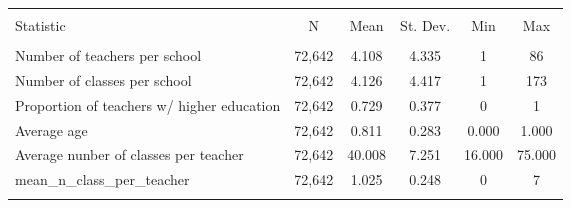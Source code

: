 
\begin{tabular}{@{\extracolsep{5pt}}lccccc} 
\\[-1.8ex]\hline 
\hline \\[-1.8ex] 
Statistic & \multicolumn{1}{c}{N} & \multicolumn{1}{c}{Mean} & \multicolumn{1}{c}{St. Dev.} & \multicolumn{1}{c}{Min} & \multicolumn{1}{c}{Max} \\ 
\hline \\[-1.8ex] 
Number of teachers per school & 72,642 & 4.108 & 4.335 & 1 & 86 \\ 
Number of classes per school & 72,642 & 4.126 & 4.417 & 1 & 173 \\ 
Proportion of teachers w/ higher education & 72,642 & 0.729 & 0.377 & 0 & 1 \\ 
Average age & 72,642 & 0.811 & 0.283 & 0.000 & 1.000 \\ 
Average nunber of classes per teacher & 72,642 & 40.008 & 7.251 & 16.000 & 75.000 \\ 
mean\_n\_class\_per\_teacher & 72,642 & 1.025 & 0.248 & 0 & 7 \\ 
\hline \\[-1.8ex] 
\end{tabular}
